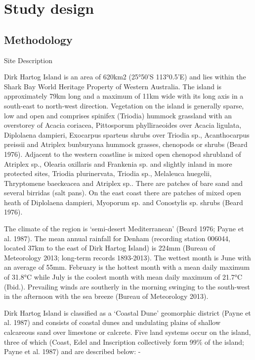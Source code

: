 \documentclass[version=last,
    paper=a4,                               %
    10pt,                                   %
    dvipsnames,
    oneside,                              %
    headings=openany,                       %
    open=any,
    BCOR=7mm,                               %
    DIV=15,     %
]{scrbook}
\begin{document}
\section*{Study design}


\subsection*{Methodology}

Site Description

Dirk Hartog Island is an area of 620km2 (25°50'S 113°0.5'E) and lies
within the Shark Bay World Heritage Property of Western Australia. The
island is approximately 79km long and a maximum of 11km wide with its
long axis in a south-east to north-west direction. Vegetation on the
island is generally sparse, low and open and comprises spinifex
(Triodia) hummock grassland with an overstorey of Acacia coriacea,
Pittosporum phylliraeoides over Acacia ligulata, Diplolaena dampieri,
Exocarpus sparteus shrubs over Triodia sp., Acanthocarpus preissii and
Atriplex bunburyana hummock grasses, chenopods or shrubs (Beard 1976).
Adjacent to the western coastline is mixed open chenopod shrubland of
Atriplex sp., Olearia oxillaris and Frankenia sp. and slightly inland in
more protected sites, Triodia plurinervata, Triodia sp., Melaleuca
huegelii, Thryptomene baeckeacea and Atriplex sp.. There are patches of
bare sand and several birridas (salt pans). On the east coast there are
patches of mixed open heath of Diplolaena dampieri, Myoporum sp. and
Conostylis sp. shrubs (Beard 1976).

The climate of the region is `semi-desert Mediterranean' (Beard 1976;
Payne et al. 1987). The mean annual rainfall for Denham (recording
station 006044, located 37km to the east of Dirk Hartog Island) is 224mm
(Bureau of Meteorology 2013; long-term records 1893-2013). The wettest
month is June with an average of 55mm. February is the hottest month
with a mean daily maximum of 31.8°C while July is the coolest month with
mean daily maximum of 21.7°C (Ibid.). Prevailing winds are southerly in
the morning swinging to the south-west in the afternoon with the sea
breeze (Bureau of Meteorology 2013).

Dirk Hartog Island is classified as a `Coastal Dune' geomorphic district
(Payne et al. 1987) and consists of coastal dunes and undulating plains
of shallow calcareous sand over limestone or calcrete. Five land systems
occur on the island, three of which (Coast, Edel and Inscription
collectively form 99\% of the island; Payne et al. 1987) and are
described below: -
\end{document}
